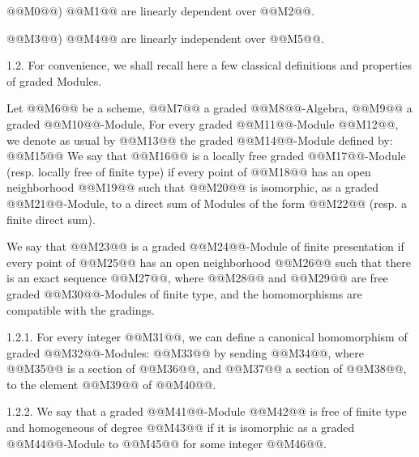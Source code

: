 @@M0@@) @@M1@@ are linearly dependent over @@M2@@.

@@M3@@) @@M4@@ are linearly independent over @@M5@@.

1.2.
For convenience, we shall recall here a few classical definitions and properties of graded Modules.

Let @@M6@@ be a scheme, @@M7@@ a graded @@M8@@-Algebra, @@M9@@ a graded @@M10@@-Module, For every graded @@M11@@-Module @@M12@@, we denote as usual by @@M13@@ the graded @@M14@@-Module defined by:
@@M15@@
We say that @@M16@@ is a locally free graded @@M17@@-Module (resp. locally free of finite type) if every point of @@M18@@ has an open neighborhood @@M19@@ such that @@M20@@ is isomorphic, as a graded @@M21@@-Module, to a direct sum of Modules of the form @@M22@@ (resp. a finite direct sum).

We say that @@M23@@ is a graded @@M24@@-Module of finite presentation if every point of @@M25@@ has an open neighborhood @@M26@@ such that there is an exact sequence @@M27@@, where @@M28@@ and @@M29@@ are free graded @@M30@@-Modules of finite type, and the homomorphisms are compatible with the gradings.

1.2.1. For every integer @@M31@@, we can define a canonical homomorphism of graded @@M32@@-Modules:
@@M33@@
by sending @@M34@@, where @@M35@@ is a section of @@M36@@, and @@M37@@ a section of @@M38@@, to the element @@M39@@ of @@M40@@.

1.2.2. We say that a graded @@M41@@-Module @@M42@@ is free of finite type and homogeneous of degree @@M43@@ if it is isomorphic as a graded @@M44@@-Module to @@M45@@ for some integer @@M46@@.

